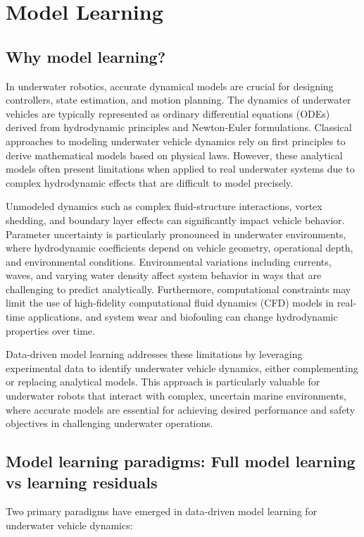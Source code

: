 \section{Model Learning}

\subsection{Why model learning?}
In underwater robotics, accurate dynamical models are crucial for designing controllers, state estimation, and motion planning. The dynamics of underwater vehicles are typically represented as ordinary differential equations (ODEs) derived from hydrodynamic principles and Newton-Euler formulations. Classical approaches to modeling underwater vehicle dynamics rely on first principles to derive mathematical models based on physical laws. However, these analytical models often present limitations when applied to real underwater systems due to complex hydrodynamic effects that are difficult to model precisely.

Unmodeled dynamics such as complex fluid-structure interactions, vortex shedding, and boundary layer effects can significantly impact vehicle behavior. Parameter uncertainty is particularly pronounced in underwater environments, where hydrodynamic coefficients depend on vehicle geometry, operational depth, and environmental conditions. Environmental variations including currents, waves, and varying water density affect system behavior in ways that are challenging to predict analytically. Furthermore, computational constraints may limit the use of high-fidelity computational fluid dynamics (CFD) models in real-time applications, and system wear and biofouling can change hydrodynamic properties over time.

Data-driven model learning addresses these limitations by leveraging experimental data to identify underwater vehicle dynamics, either complementing or replacing analytical models. This approach is particularly valuable for underwater robots that interact with complex, uncertain marine environments, where accurate models are essential for achieving desired performance and safety objectives in challenging underwater operations.

\subsection{Model learning paradigms: Full model learning vs learning residuals}
Two primary paradigms have emerged in data-driven model learning for underwater vehicle dynamics:

